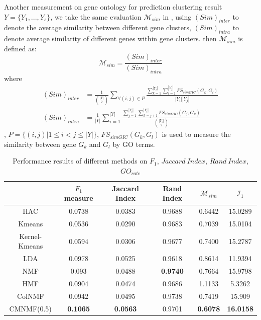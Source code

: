 \documentclass{bmcart}
\begin{document}
Another measurement on gene ontology for prediction clustering result $Y=\{Y_1,...,Y_s\}$, we take the same evaluation $\mathcal{M}_{sim}$ in \cite{Bordino2010}, using  $(Sim)_{inter}$ to denote the average similarity between different gene clusters, $(Sim)_{intra}$ to denote average similarity of different genes within gene clusters. then $\mathcal{M}_{sim}$ is defined as:
$$
\mathcal{M}_{sim} = \frac{(Sim)_{inter}}{(Sim)_{intra}}
$$
where
\begin{equation}\label{}\nonumber
\begin{split}
(Sim)_{inter}&=\frac{1}{{|Y|\choose 2}}\sum_{\forall(i,j)\in P}
\frac{\sum_{k=1}^{|Y_i|}\sum_{l=1}^{|Y_j|}FS_{simGIC}(G_k,G_l)}{|Y_i||Y_j|}\\
(Sim)_{intra}&=\frac{1}{|Y|}\sum_{i=1}^{|Y|}
\frac{\sum_{j=1}^{|Y_i|}\sum_{k=j+1}^{|Y_i|}FS_{simGIC}(G_j,G_k)}{{|Y_i|\choose 2}}
\end{split}
\end{equation}
,
$P=\{(i,j)|1\leq i< j\leq|Y|\}$, $FS_{simGIC}(G_k,G_l)$ \cite{Teng2013} is used to measure the similarity between gene $G_k$ and $G_l$ by GO terms.
\begin{table}[!t]
\centering
\caption{Performance results of different methods on $F_1$, $Jaccard\ Index$, $Rand\ Index$, $GO_{rate}$}\label{tab:measurements}
\begin{tabular}{c|ccccc}
\hline
&$F_1$ measure &Jaccard Index& Rand Index&$\mathcal{M}_{sim}$&$\mathcal{I}_1$\\
\hline
HAC&0.0738&0.0383&0.9688&0.6442&15.0289\\
Kmeans&0.0536&0.0290&0.9683&0.7039&15.0104\\
Kernel-Kmeans&0.0594&0.0306&0.9677&0.7400&15.2787\\
LDA&0.0978&0.0525&0.9618&0.8614&11.9394\\
NMF&0.093&0.0488&\textbf{0.9740}&0.7664&15.9798\\
HMF&0.0904&0.0474&0.9686&1.1133&5.3262\\
ColNMF&0.0942&0.0495&0.9738&0.7419&15.909\\
CMNMF(0.5)&\textbf{0.1065}& \textbf{0.0563}&{0.9701}& \textbf{0.6078}&\textbf{16.0158}\\
\hline
\end{tabular}
\end{table}
\end{document}

